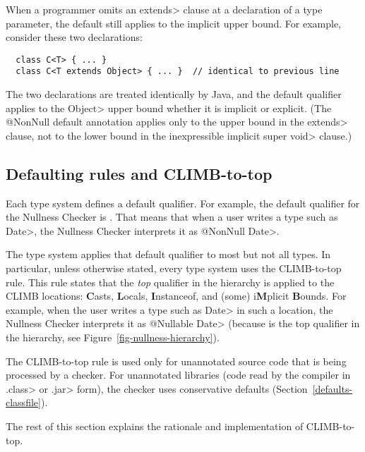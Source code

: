 When a programmer omits an \<extends> clause at a declaration of a type
parameter, the default still applies to the implicit upper bound.  For
example, consider these two declarations:

\begin{Verbatim}
  class C<T> { ... }
  class C<T extends Object> { ... }  // identical to previous line
\end{Verbatim}

\noindent
The two declarations are treated identically by Java, and the default
qualifier applies to the \<Object> upper bound whether it is implicit or
explicit.  (The @NonNull default annotation applies only to the upper bound
in the \<extends> clause, not to the lower bound in the inexpressible
implicit \<super void> clause.)


\subsection{Defaulting rules and CLIMB-to-top\label{climb-to-top}}

Each type system defines a default qualifier.  For example, the default
qualifier for the Nullness Checker is
.  That means that when a user
writes a type such as \<Date>, the Nullness Checker interprets it as
\<@NonNull Date>.

The type system applies that default qualifier to most but
not all types.  In particular, unless otherwise stated, every type system
uses the CLIMB-to-top rule.  This
rule states that the \emph{top} qualifier in the hierarchy is applied to
the CLIMB locations:  \textbf{C}asts, \textbf{L}ocals, \textbf{I}nstanceof,
and (some) i\textbf{M}plicit \textbf{B}ounds.
For example, when the user writes a type such as \<Date> in such a
location, the Nullness Checker interprets it as \<@Nullable Date> (because
 is the top qualifier in the
hierarchy, see Figure~\ref{fig-nullness-hierarchy}).


The CLIMB-to-top rule is used only for unannotated source code that is
being processed by a checker.  For unannotated libraries (code read by the
compiler in \<.class> or \<.jar> form), the checker uses conservative
defaults (Section~\ref{defaults-classfile}).

The rest of this section explains the rationale and implementation of
CLIMB-to-top.

